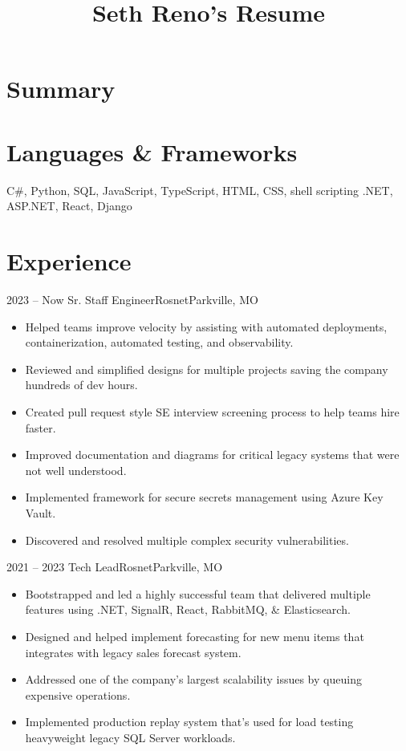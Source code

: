 \documentclass[11pt,letterpaper,final]{moderncv}
\title{Seth Reno's Resume}
\begin{document}
\maketitle
\section{Summary}

\section{Languages \& Frameworks}
		{C\#, Python, SQL, JavaScript, TypeScript, HTML, CSS, shell scripting}
\linebreak
		{.NET, ASP.NET, React, Django}

\section{Experience} 
	\cventry
{2023 -- Now } {Sr. Staff Engineer}{Rosnet}{Parkville, MO}{}{
		\begin{itemize}
			\item
				Helped teams improve velocity by assisting with automated
				deployments, containerization, automated testing, and
				observability.
			\item
				Reviewed and simplified designs for multiple projects saving the
				company hundreds of dev hours.
			\item
				Created pull request style SE interview screening process to
				help teams hire faster.
			\item
				Improved documentation and diagrams for critical legacy systems
				that were not well understood.
			\item
				Implemented framework for secure secrets management using Azure
				Key Vault.
			\item
				Discovered and resolved multiple complex security
				vulnerabilities.
		\end{itemize}
}
\linebreak

	\cventry
{2021 -- 2023} {Tech Lead}{Rosnet}{Parkville, MO}{}{
		\begin{itemize}
			\item
				Bootstrapped and led a highly successful team that delivered
				multiple features using .NET, SignalR, React, RabbitMQ, \&
				Elasticsearch.
			\item
				Designed and helped implement forecasting for new menu
				items that integrates with legacy sales forecast system.
			\item
				Addressed one of the company's largest scalability issues by
				queuing expensive operations.
			\item
				Implemented production replay system that's used for load
				testing heavyweight legacy SQL Server workloads.
		\end{itemize}
}
\linebreak
\end{document}
